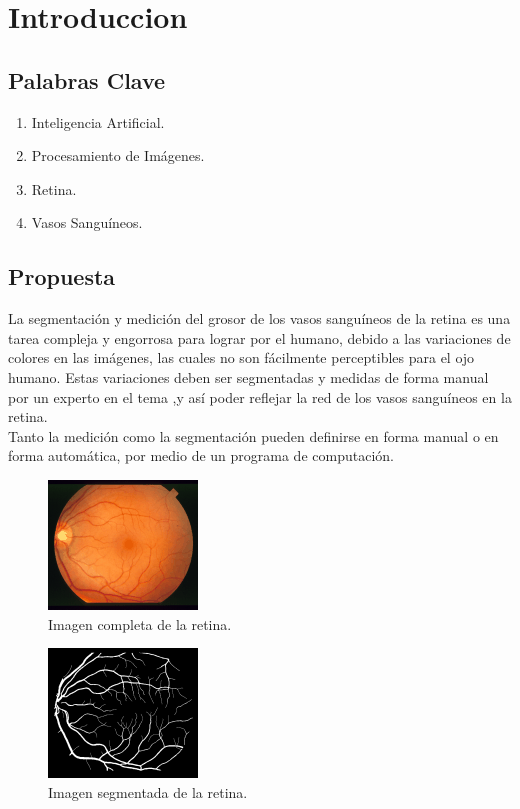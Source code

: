 \documentclass[14pt]{article}
\begin{document}
\section{Introduccion}
\subsection{Palabras Clave}
\begin{enumerate}
	\item Inteligencia Artificial.
	\item Procesamiento de Imágenes.
	\item Retina.
	\item Vasos Sanguíneos.

\end{enumerate}

\subsection{Propuesta}
La segmentación y medición del grosor de los vasos sanguíneos de la retina es una tarea compleja y engorrosa para lograr por el humano, debido a las variaciones de colores en las imágenes, las cuales no son fácilmente perceptibles para el ojo humano. Estas variaciones deben ser segmentadas  y medidas de forma manual por un experto en el tema ,y así poder reflejar la red de los vasos sanguíneos en la retina.\\%
Tanto la medición como la segmentación pueden definirse en forma manual o en forma automática, por medio de un programa de computación.\\%



\begin{figure}[h]
	\begin{center}
		\includegraphics[scale=0.5]{./Imagenes/Retina.png}
		\caption{Imagen completa de la retina.}
	\end{center}
\end{figure} 



\begin{figure}[h]
	\begin{center}
		\includegraphics[scale=.5]{./Imagenes/Retinasegmentada.png}
		\caption{Imagen segmentada de la retina.}
	\end{center}
\end{figure} 
\end{document}

